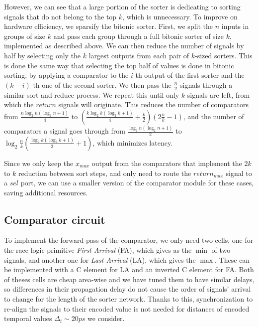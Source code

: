 \documentclass{article}
\begin{document}
However, we can see that a large portion of the sorter is
dedicating to sorting signals that do not belong to the top
$k$, which is unnecessary. To improve on hardware
efficiency, we sparsify the bitonic sorter. First, we split
the $n$ inputs in groups of size $k$ and pass each group
through a full bitonic sorter of size $k$, implemented as
described above. We can then reduce the number of signals by
half by selecting only the $k$ largest outputs from each
pair of $k$-sized sorters. This is done the same way that
selecting the top half of values is done in bitonic sorting,
by applying a comparator to the $i$-th output of the first
sorter and the $(k-i)$-th one of the second sorter. We then
pass the $\frac{n}{2}$ signals through a similar sort and
reduce process. We repeat this until only $k$ signals are
left, from which the $return$ signals will originate. This
reduces the number of comparators from $\frac{n \log_2{n}
(\log_2{n}+1)}{4}$ to $(\frac{k \log_2{k} (\log_2{k}+1)}{4} +\frac{k}{2}) (2\frac{n}{k}-1)$, and the number
of comparators a signal goes through from $\frac{\log_2{n}
(\log_2{n}+1)}{2}$ to $\log_2{\frac{n}{k}}(\frac{\log_2{k}
(\log_2{k}+1)}{2} + 1)$, which minimizes
latency.

Since we only keep the $x_{max}$ output from the comparators
that implement the $2k$ to $k$ reduction between sort steps,
and only need to route the $return_{max}$ signal to a $sel$
port, we can use a smaller version of the comparator module
for these cases, saving additional resources.

\subsection{Comparator circuit}

To implement the forward pass of the comparator, we only
need two cells, one for the race logic primitive
\textit{First Arrival} (FA), which gives as the $\min$ of
two signals, and another one for \textit{Last Arrival} (LA),
which gives the $\max$. These can be implemented with a C
element for LA and an inverted C element for FA. Both of
theses cells are cheap area-wise and we have tuned them to
have similar delays, so differences in their propagation
delay do not cause the order of signals' arrival to change
for the length of the sorter network. Thanks to this,
synchronization to re-align the signals to their encoded
value is not needed for distances of encoded temporal values
$\Delta_t \sim 20ps$ we consider.
\end{document}
